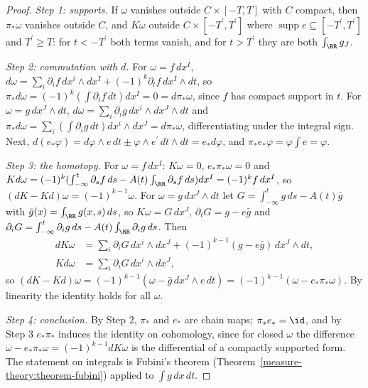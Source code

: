 \begin{proof}
\emph{Step 1: supports.} If $\omega$ vanishes outside $C \times [-T, T]$ with $C$ compact, then $\pi_*\omega$ vanishes outside $C$, and $K\omega$ outside $C \times [-T^{\prime}, T^{\prime}]$ where $\operatorname{supp}e \subseteq [-T^{\prime}, T^{\prime}]$ and
$T^{\prime} \geq T$: for $t < -T^{\prime}$ both terms vanish, and for $t > T^{\prime}$ they are both $\int_\RR g_J$.

\emph{Step 2: commutation with $d$.} For $\omega = f\,dx^I$, $d\omega = \sum_i\partial_if\,dx^i \wedge dx^I + (-1)^k\partial_tf\,dx^I \wedge dt$, so $\pi_*d\omega = (-1)^k(\int\partial_tf\,dt)dx^I = 0 = d\pi_*\omega$, since $f$ has compact
support in $t$. For $\omega = g\,dx^J \wedge dt$, $d\omega = \sum_i\partial_ig\,dx^i \wedge dx^J \wedge dt$ and $\pi_*d\omega = \sum_i(\int\partial_ig\,dt)dx^i \wedge dx^J = d\pi_*\omega$, differentiating under the integral sign.
Next, $d(e_*\varphi) = d\varphi \wedge e\,dt \pm \varphi \wedge e^{\prime}\,dt \wedge dt = e_*d\varphi$, and $\pi_*e_*\varphi = \varphi\int e = \varphi$.

\emph{Step 3: the homotopy.} For $\omega = f\,dx^I$: $K\omega = 0$, $e_*\pi_*\omega = 0$ and $Kd\omega = (-1)^k(\int_{-\infty}^t\partial_sf\,ds - A(t)\int_\RR\partial_sf\,ds)dx^I = (-1)^kf\,dx^I$, so
$(dK - Kd)\omega = (-1)^{k-1}\omega$. For $\omega = g\,dx^J \wedge dt$ let $G = \int_{-\infty}^tg\,ds - A(t)\bar g$ with $\bar g(x) = \int_\RR g(x, s)\,ds$, so $K\omega = G\,dx^J$, $\partial_tG = g - e\bar g$ and
$\partial_iG = \int_{-\infty}^t\partial_ig\,ds - A(t)\int_\RR\partial_ig\,ds$. Then
\[
\begin{aligned}
dK\omega &= \sum_i\partial_iG\,dx^i \wedge dx^J + (-1)^{k-1}(g - e\bar g)\,dx^J \wedge dt, \\
Kd\omega &= \sum_i\partial_iG\,dx^i \wedge dx^J,
\end{aligned}
\]
so $(dK - Kd)\omega = (-1)^{k-1}(\omega - \bar g\,dx^J \wedge e\,dt) = (-1)^{k-1}(\omega - e_*\pi_*\omega)$. By linearity the identity holds for all $\omega$.

\emph{Step 4: conclusion.} By Step 2, $\pi_*$ and $e_*$ are chain maps; $\pi_*e_* = \id$, and by Step 3 $e_*\pi_*$ induces the identity on cohomology, since for closed $\omega$ the difference $\omega - e_*\pi_*\omega = (-1)^{k-1}dK\omega$
is the differential of a compactly supported form. The statement on integrals is Fubini's theorem (Theorem~\ref{measure-theory:theorem-fubini}) applied to $\int g\,dx\,dt$.
\end{proof}

